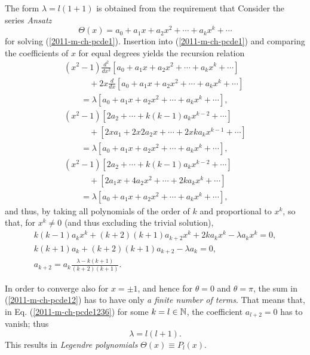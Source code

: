 The form $\lambda =l(1+1)$ is obtained from the requirement that
Consider the series {\it Ansatz}
\begin{equation}
\Theta(x) = a_0 +a_1x +a_2 x^2 + \cdots + a_kx^k +\cdots
\label{2011-m-ch-pcde12}
\end{equation}
for solving (\ref{2011-m-ch-pcde1}).
Insertion into  (\ref{2011-m-ch-pcde1}) and comparing the coefficients of $x$
for equal degrees
yields the recursion relation
\begin{equation}
\begin{array}{l}
\left(x^2-1 \right)\frac{   d   ^2  }{   d    x^2 }
[a_0 +a_1x +a_2 x^2 + \cdots + a_kx^k +\cdots  ]    \\

\qquad \quad   + 2 x \frac{   d    }{   d    x }[a_0 +a_1x +a_2 x^2 + \cdots + a_kx^k +\cdots  ]  \\
\qquad =  \lambda [a_0 +a_1x +a_2 x^2 + \cdots + a_kx^k +\cdots  ] ,\\
\left(x^2-1 \right)  [ 2a_2   + \cdots + k(k-1)a_kx^{k-2} +\cdots  ]  \\
 \qquad \quad   + [2 x a_1  +2 x  2a_2 x  + \cdots + 2 x k a_kx^{k-1} +\cdots  ]  \\
\qquad =  \lambda [a_0 +a_1x +a_2 x^2 + \cdots + a_kx^k +\cdots  ] ,\\
\left(x^2-1 \right)  [ 2a_2   + \cdots + k(k-1)a_kx^{k-2} +\cdots  ]    \\
 \qquad \quad   +  [2 a_1 x  +4a_2 x^2  + \cdots + 2  k a_kx^{k} +\cdots  ]  \\
\qquad =  \lambda [a_0 +a_1x +a_2 x^2 + \cdots + a_kx^k +\cdots  ] ,
\end{array}
\label{2011-m-ch-pcde123}
\end{equation}
and thus, by taking all polynomials of the order of $k$ and proportional to $x^k$,
so that, for $x^k\neq 0$ (and thus excluding the trivial solution),
\begin{equation}
\begin{array}{l}
k(k-1)a_kx^{k} + (k+2)(k+1)a_{k+2}x^{k} +  2ka_kx^{k}  -\lambda  a_kx^k =0,\\
k(k+1)a_k  + (k+2)(k+1)a_{k+2}    -\lambda  a_k  =0,\\
a_{k+2} = a_k\frac{\lambda - k(k+1)}{(k+2)(k+1)}.
\end{array}
\label{2011-m-ch-pcde1236}
\end{equation}

In order to converge also for $x=\pm 1$, and hence for $\theta =0$ and $\theta= \pi$,
the sum in (\ref{2011-m-ch-pcde12})
has to have only {\em a finite number of terms}.
That means that, in Eq. (\ref{2011-m-ch-pcde1236})
for some $k=l\in {\Bbb N}$, the coefficient  $a_{l+2}=0$ has to vanish; thus
\begin{equation}
\lambda = l(l+1).
\label{2011-m-ch-pcde12361}
\end{equation}
This results in {\it Legendre polynomials} $\Theta (x) \equiv P_l(x)$.


